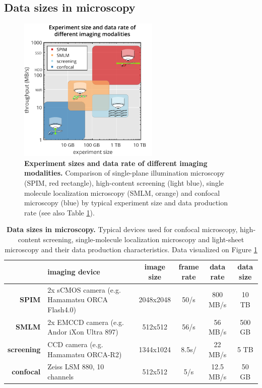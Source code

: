 \documentclass{diploma_style}
\begin{document}
\subsection{Data sizes in microscopy}

\begin{figure}[tpb]
 \centering
 \includegraphics[page=1,width=0.6\textwidth]{figures/4_gpu/comparison_with_pictograms}
 \caption{\textbf{Experiment sizes and data rate of different imaging modalities.} Comparison of single-plane illumination microscopy (SPIM, red rectangle), high-content screening (light blue), single molecule localization microscopy (SMLM, orange) and confocal microscopy (blue) by typical experiment size and data production rate (see also Table \ref{tab:sizes}).}
 \label{fig:sizes}
\end{figure}


\begin{table}[tbp]
\begin{small}
\renewcommand{\arraystretch}{2}
\centering
\begin{tabular}{rp{5cm}cccc}
	& \textbf{imaging device} & \textbf{image size} &  \parbox[c]{1cm}{\textbf{frame}\\ \textbf{rate}} & \textbf{data rate} & \parbox[c]{1cm}{\textbf{data\\ size}} \\
	\hline
	\hline
	\textbf{SPIM} & 2x sCMOS camera (e.g. Hamamatsu ORCA Flash4.0) & 2048x2048 & 50/s & 800 MB/s & 10 TB \\ \hline
	\textbf{SMLM} & 2x EMCCD camera (e.g. Andor iXon Ultra 897) & 512x512 & 56/s & 56 MB/s & 500 GB \\ \hline
	\textbf{screening} & CCD camera (e.g. Hamamatsu ORCA-R2) & 1344x1024 & 8.5s/ & 22 MB/s & 5 TB \\ \hline
	\textbf{confocal} & Zeiss LSM 880, 10 channels & 512x512 & 5/s & 12.5 MB/s & 50 GB \\ 
\end{tabular}
\caption{\textbf{Data sizes in microscopy.} Typical devices used for confocal microscopy, high-content screening, single-molecule localization microscopy and light-sheet microscopy and their data production characteristics. Data visualized on Figure \ref{fig:sizes}}
\label{tab:sizes}
\end{small}
\end{table}
\end{document}
